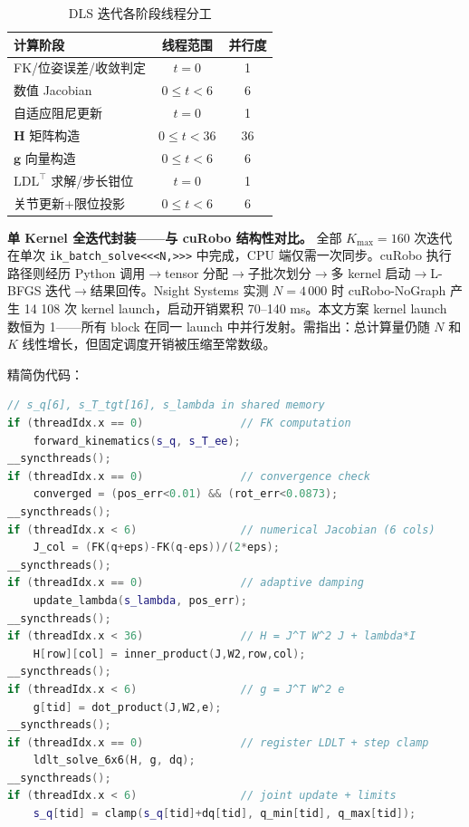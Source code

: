 \documentclass[twocolumn,a4paper,10pt]{ctexart}
\begin{document}
\begin{table}[ht]
\centering
\caption{DLS 迭代各阶段线程分工}
\label{tab:thread}
\begin{tabular}{lcc}
\toprule
计算阶段 & 线程范围 & 并行度 \\
\midrule
FK/位姿误差/收敛判定 & $t=0$ & 1 \\
数值 Jacobian & $0\le t<6$ & 6 \\
自适应阻尼更新 & $t=0$ & 1 \\
$\mathbf{H}$ 矩阵构造 & $0\le t<36$ & 36 \\
$\mathbf{g}$ 向量构造 & $0\le t<6$ & 6 \\
$\mathrm{LDL}^\top$ 求解/步长钳位 & $t=0$ & 1 \\
关节更新+限位投影 & $0\le t<6$ & 6 \\
\bottomrule
\end{tabular}
\end{table}

{\bfseries 单 Kernel 全迭代封装——与 cuRobo 结构性对比。} 全部 $K_{\max}=160$ 次迭代在单次 \texttt{ik\_batch\_solve<<<N,>>>} 中完成，CPU 端仅需一次同步。cuRobo 执行路径则经历 Python 调用$\to$tensor 分配$\to$子批次划分$\to$多 kernel 启动$\to$L-BFGS 迭代$\to$结果回传。Nsight Systems 实测 $N=4\,000$ 时 cuRobo-NoGraph 产生 14 108 次 kernel launch，启动开销累积 70--140 ms。本文方案 kernel launch 数恒为 1——所有 block 在同一 launch 中并行发射。需指出：总计算量仍随 $N$ 和 $K$ 线性增长，但固定调度开销被压缩至常数级。

精简伪代码：

\begin{lstlisting}[language=C++, caption={DLS单次迭代伪代码（per-block，128线程）}]
// s_q[6], s_T_tgt[16], s_lambda in shared memory
if (threadIdx.x == 0)               // FK computation
    forward_kinematics(s_q, s_T_ee);
__syncthreads();
if (threadIdx.x == 0)               // convergence check
    converged = (pos_err<0.01) && (rot_err<0.0873);
__syncthreads();
if (threadIdx.x < 6)                // numerical Jacobian (6 cols)
    J_col = (FK(q+eps)-FK(q-eps))/(2*eps);
__syncthreads();
if (threadIdx.x == 0)               // adaptive damping
    update_lambda(s_lambda, pos_err);
__syncthreads();
if (threadIdx.x < 36)               // H = J^T W^2 J + lambda*I
    H[row][col] = inner_product(J,W2,row,col);
__syncthreads();
if (threadIdx.x < 6)                // g = J^T W^2 e
    g[tid] = dot_product(J,W2,e);
__syncthreads();
if (threadIdx.x == 0)               // register LDLT + step clamp
    ldlt_solve_6x6(H, g, dq);
__syncthreads();
if (threadIdx.x < 6)                // joint update + limits
    s_q[tid] = clamp(s_q[tid]+dq[tid], q_min[tid], q_max[tid]);
\end{lstlisting}
\end{document}
